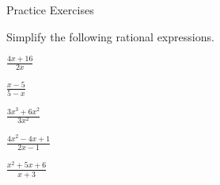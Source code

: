 {Practice Exercises}



Simplify  the following  rational expressions.



  $ \frac{4x+16}{2x}$

  $ \frac{x-5}{5-x}$

  $ \frac{3x^{3}+6x^{2}}{3x^{2}}$

  $ \frac{4x^{2}-4x+1}{2x-1}$

  $ \frac{x^{2}+5x+6}{x+3}$

